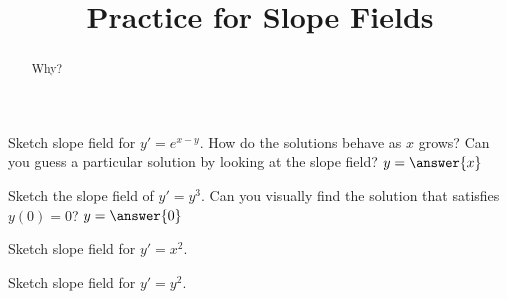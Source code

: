 \documentclass{ximera}
\title{Practice for Slope Fields}
\begin{document}
\begin{abstract}
    Why?
\end{abstract}
\maketitle

\begin{exercise}
    Sketch slope field for $y'=e^{x-y}$.  How do the solutions behave as $x$ grows?  Can you guess a particular solution by looking at the slope field? $y = \answer{x}$
\end{exercise}
%

\begin{exercise}%
    Sketch the slope field of $y'=y^3$.  Can you visually find the solution that satisfies $y(0)=0$? $y = \answer{0}$
\end{exercise}


\begin{exercise}
    Sketch slope field for $y'=x^2$.
\end{exercise}

\begin{exercise}
    Sketch slope field for $y'=y^2$.
\end{exercise}
\end{document}
